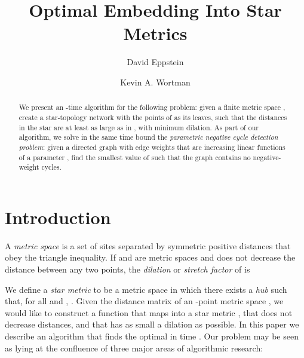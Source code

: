 \documentclass{llncs}
\begin{document}
\lstset{language=Python}

\title{Optimal Embedding Into Star Metrics}

\author{David Eppstein \and Kevin A. Wortman}




\maketitle

\begin{abstract}
We  present an -time algorithm for  the following problem: given a finite metric space , create a star-topology network with the points of  as its leaves, such that the distances in the star are at least as large as in , with minimum dilation. As part of our algorithm, we solve in the same time bound the \emph{parametric negative cycle detection problem}: given a directed graph with edge weights that are increasing linear functions of a parameter , find the smallest value of  such that the graph contains no negative-weight cycles.
\end{abstract}

\section{Introduction}
\label{section:introduction}
A \emph{metric space} is a set of sites separated by symmetric positive distances that obey the triangle inequality. If  and  are metric spaces and  does not decrease the distance between any two points, the \emph{dilation} or \emph{stretch factor} of  is

We define a \emph{star metric} to be a metric space in which there exists a \emph{hub}  such that, for all  and , . Given the distance matrix of an -point metric space , we would like to construct a function  that maps  into a star metric , that does not decrease distances, and that has as small a dilation as possible. In this paper we describe an algorithm that finds the optimal  in time .
Our problem may be seen as lying at the confluence of three major areas of algorithmic research:
\end{document}
